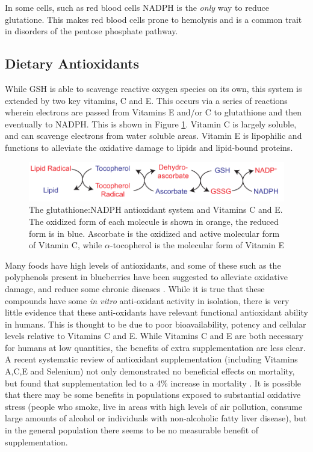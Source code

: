 \documentclass{tufte-handout}
\begin{document}
In some cells, such as red blood cells NADPH is the \textit{only} way to reduce glutatione.  This makes red blood cells prone to hemolysis and is a common trait in disorders of the pentose phosphate pathway.

\subsection{Dietary Antioxidants}
While GSH is able to scavenge reactive oxygen species on its own, this system is extended by two key vitamins, C and E.  This occurs via a series of reactions wherein electrons are passed from Vitamins E and/or C to glutathione and then eventually to NADPH.  This is shown in Figure \ref{fig:gsh-system-vitamins}.  Vitamin C is largely soluble, and can scavenge electrons from water soluble areas.  Vitamin E is lipophilic and functions to alleviate the oxidative damage to lipids and lipid-bound proteins.

\begin{figure}
\includegraphics{figures/gsh-nadph-vitamins.pdf}
\caption{The glutathione:NADPH antioxidant system and Vitamins C and E.  The oxidized form of each molecule is shown in orange, the reduced form is in blue.  Ascorbate is the oxidized and active molecular form of Vitamin C, while $\alpha$-tocopherol is the molecular form of Vitamin E}
\label{fig:gsh-system-vitamins}
\end{figure}

Many foods have high levels of antioxidants, and some of these such as the polyphenols present in blueberries have been suggested to alleviate oxidative damage, and reduce some chronic diseases \citep{Pandey2009}.  While it is true that these compounds have some \textit{in vitro} anti-oxidant activity in isolation, there is very little evidence that these anti-oxidants have relevant functional antioxidant ability in humans.  This is thought to be due to poor bioavailability, potency and cellular levels relative to Vitamins C and E.  While Vitamins C and E are both necessary for humans at low quantities, the benefits of extra supplementation are less clear.  A recent systematic review of antioxidant supplementation (including Vitamins A,C,E and Selenium) not only demonstrated no beneficial effects on mortality, but found that supplementation led to a 4\% increase in mortality \citep{Bjelakovic2012}.  It is possible that there may be some benefits in populations exposed to substantial oxidative stress (people who smoke, live in areas with high levels of air pollution, consume large amounts of alcohol or individuals with non-alcoholic fatty liver disease), but in the general population there seems to be no measurable benefit of supplementation.  
\end{document}
